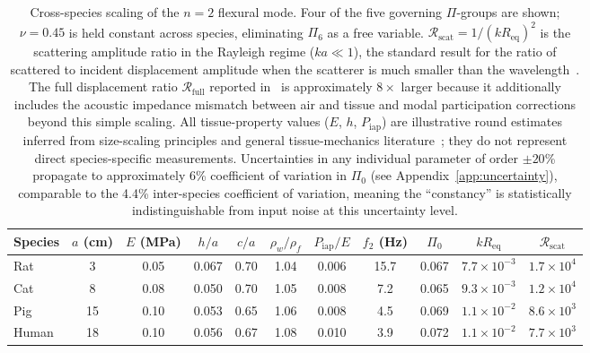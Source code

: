 \documentclass[review]{elsarticle}
\begin{document}
\begin{table}[htbp]
  \centering
  \caption{Cross-species scaling of the $n=2$ flexural mode.
  Four of the five governing $\Pi$-groups are shown; $\nu = 0.45$ is held
  constant across species, eliminating $\Pi_6$ as a free variable.
  $\mathcal{R}_\mathrm{scat} = 1/(kR_\mathrm{eq})^2$ is the scattering
  amplitude ratio in the Rayleigh regime ($ka \ll 1$), the standard
  result for the ratio of scattered to incident displacement amplitude when the
  scatterer is much smaller than the
  wavelength~\cite{MorseIngard1968,Pierce1989}.
  The full displacement ratio $\mathcal{R}_\mathrm{full}$ reported
  in~\cite{Mace2026browntone} is approximately $8\times$ larger because
  it additionally includes the acoustic impedance mismatch between air and
  tissue and modal participation corrections beyond this simple scaling.
  All tissue-property values ($E$, $h$, $P_\mathrm{iap}$) are illustrative
  round estimates inferred from size-scaling principles and general
  tissue-mechanics literature~\cite{Fung1993,McMahonBonner1983}; they
  do not represent direct species-specific measurements.  Uncertainties in
  any individual parameter of order $\pm 20$\% propagate to approximately
  $6$\% coefficient of variation in $\Pi_0$ (see Appendix~\ref{app:uncertainty}),
  comparable to the 4.4\%
  inter-species coefficient of variation, meaning the ``constancy'' is
  statistically indistinguishable from input noise at this uncertainty level.}
  \label{tab:scaling}
  \begin{tabular}{lcccccccccc}
    \toprule
    Species & $a$ (cm) & $E$ (MPa) & $h/a$ & $c/a$ & $\rho_w/\rho_f$ & $P_\mathrm{iap}/E$
            & $f_2$ (Hz) & $\Pi_0$ & $kR_\mathrm{eq}$ & $\mathcal{R}_\mathrm{scat}$ \\
    \midrule
    Rat   &  3 & 0.05 & 0.067 & 0.70 & 1.04 & 0.006
          & 15.7 & 0.067 & $7.7 \times 10^{-3}$ & $1.7 \times 10^{4}$ \\
    Cat   &  8 & 0.08 & 0.050 & 0.70 & 1.05 & 0.008
          & 7.2  & 0.065 & $9.3 \times 10^{-3}$ & $1.2 \times 10^{4}$ \\
    Pig   & 15 & 0.10 & 0.053 & 0.65 & 1.06 & 0.008
          & 4.5  & 0.069 & $1.1 \times 10^{-2}$ & $8.6 \times 10^{3}$ \\
    Human & 18 & 0.10 & 0.056 & 0.67 & 1.08 & 0.010
          & 3.9  & 0.072 & $1.1 \times 10^{-2}$ & $7.7 \times 10^{3}$ \\
    \bottomrule
  \end{tabular}
\end{table}
\end{document}
